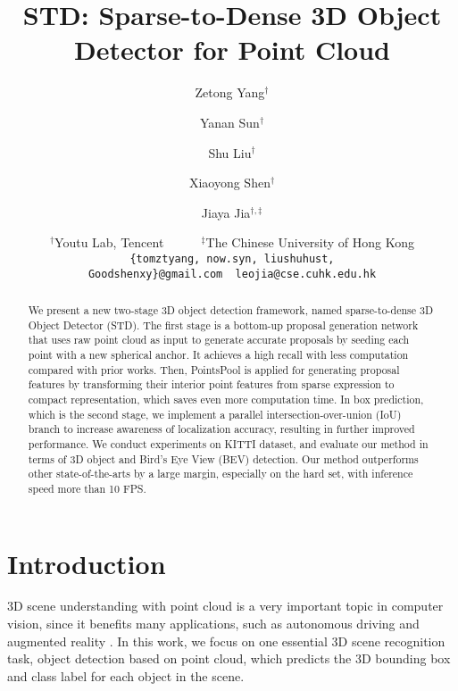 \documentclass[10pt,twocolumn,letterpaper]{article}
\begin{document}
\title{STD: Sparse-to-Dense 3D Object Detector for Point Cloud}

\author{Zetong Yang$^{\dag}$\\
\and
Yanan Sun$^{\dag}$
\and
Shu Liu$^{\dag}$
\and 
Xiaoyong Shen$^{\dag}$
\and 
Jiaya Jia$^{\dag, \ddagger}$
\\
\and
$^{\dag}$Youtu Lab, Tencent~~~~~~$^{\ddagger}$The Chinese University of Hong Kong\\
\vspace{-2mm}
{\tt\small \{tomztyang, now.syn, liushuhust, Goodshenxy\}@gmail.com~~leojia@cse.cuhk.edu.hk} 
}
\maketitle



\begin{abstract}
   We present a new two-stage 3D object detection framework, named sparse-to-dense 3D Object Detector (STD). The first stage is a bottom-up proposal generation network that uses raw point cloud as input to generate accurate proposals by seeding each point with a new spherical anchor. It achieves a high recall with less computation compared with prior works. Then, PointsPool is applied for generating proposal features by transforming their interior point features from sparse expression to compact representation, which saves even more computation time. In box prediction, which is the second stage,  we implement a parallel intersection-over-union (IoU) branch to increase awareness of localization accuracy, resulting in further improved performance. We conduct experiments on KITTI dataset, and evaluate our method in terms of 3D object and Bird's Eye View (BEV) detection. Our method outperforms other state-of-the-arts by a large margin, especially on the hard set, with inference speed more than 10 FPS. 
\end{abstract}

\section{Introduction}
3D scene understanding with point cloud is a very important topic in computer vision, since it benefits many applications, such as autonomous driving \cite{KITTIDATASET2} and augmented reality \cite{Multiple3Dtracking}. In this work, we focus on one essential 3D scene recognition task, object detection based on point cloud, which predicts the 3D bounding box and class label for each object in the scene.
\end{document}
